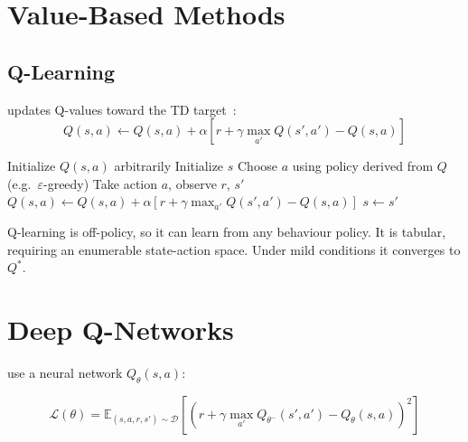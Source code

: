 \section{Value-Based Methods}


\subsection{Q-Learning}

 updates Q-values toward the TD target~\cite{Watkins1992QLearning}:
\begin{equation}
    Q(s,a) \gets Q(s,a) + \alpha \left[ r + \gamma \max_{a'} Q(s',a') - Q(s,a) \right]
\end{equation}

\begin{algorithm}[H]
\caption{Q-Learning}
\begin{algorithmic}[1]
\State Initialize $Q(s,a)$ arbitrarily
    \State Initialize $s$
        \State Choose $a$ using policy derived from $Q$ (e.g.\ $\varepsilon$-greedy)
        \State Take action $a$, observe $r$, $s'$
        \State $Q(s,a) \gets Q(s,a) + \alpha [r + \gamma \max_{a'} Q(s',a') - Q(s,a)]$
        \State $s \gets s'$
    \EndWhile
\EndFor
\end{algorithmic}
\end{algorithm}

 Q-learning is off-policy, so it can learn from any behaviour policy. It is tabular, requiring an enumerable state-action space. Under mild conditions it converges to $Q^*$.


\section{Deep Q-Networks}


 use a neural network $Q_\theta(s,a)$:

\begin{equation}
    \mathcal{L}(\theta) = \mathbb{E}_{(s,a,r,s') \sim \mathcal{D}} \left[ (r + \gamma \max_{a'} Q_{\theta^-}(s',a') - Q_\theta(s,a))^2 \right]
\end{equation}

